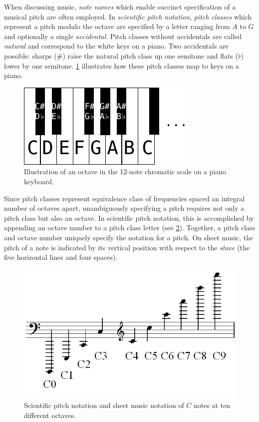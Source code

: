 When discussing music, \emph{note names} which enable succinct specification of
a musical pitch are often employed. In \emph{scientific pitch notation},
\emph{pitch classes} which represent a pitch modulo the octave are specified by
a letter ranging from $A$ to $G$ and optionally a single \emph{accidental}. Pitch
classes without accidentals are called \emph{natural} and correspond to the white
keys on a piano. Two accidentals are possible: sharps ($\#$) raise the natural
pitch class up one semitone and flats ($\flat$) lower by one semitone.
\cref{fig:piano-keys} illustrates how these pitch classes map to keys on a
piano.

\begin{figure}[tb]
    \centering
    \includegraphics[width=0.6\linewidth]{piano-keys.pdf}
    \caption{Illustration of an octave in the 12-note chromatic scale on a piano keyboard.}
    \label{fig:piano-keys}
\end{figure}

Since pitch classes represent equivalence class of frequencies spaced an
integral number of octaves apart, unambiguously specifying a pitch requires not
only a pitch class but also an octave. In scientific pitch notation, this is
accomplished by appending an octave number to a pitch class letter (see
\cref{fig:pitch-class}). Together, a pitch class and octave number uniquely
specify the notation for a pitch. On sheet music, the pitch of a note is
indicated by its vertical position with respect to the \emph{stave} (the five
horizontal lines and four spaces).

\begin{figure}[tb]
    \centering
    \includegraphics[width=0.6\linewidth]{Pitch_notation.png}
    \caption{Scientific pitch notation and sheet music notation of $C$ notes at ten different octaves.}
    \label{fig:pitch-class}
\end{figure}

